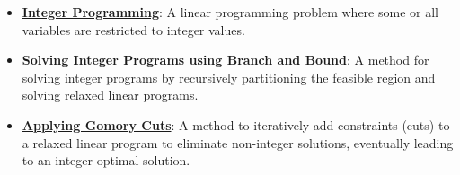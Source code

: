 \documentclass{article}%
\begin{document}
\begin{itemize}[leftmargin=*]%
\item \href{https://www.math.purdue.edu/~yipn/421//2024-10-31-IntLinProg.pdf#page=1}{\textbf{Integer Programming}}: A linear programming problem where some or all variables are restricted to integer values.%
\item \href{https://www.math.purdue.edu/~yipn/421//2024-10-31-IntLinProg.pdf#page=5}{\textbf{Solving Integer Programs using Branch and Bound}}: A method for solving integer programs by recursively partitioning the feasible region and solving relaxed linear programs.%
\item \href{https://www.math.purdue.edu/~yipn/421//2024-10-31-IntLinProg.pdf#page=15}{\textbf{Applying Gomory Cuts}}: A method to iteratively add constraints (cuts) to a relaxed linear program to eliminate non-integer solutions, eventually leading to an integer optimal solution.%
\end{itemize}%
\end{document}
